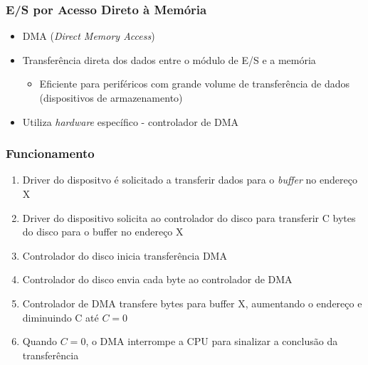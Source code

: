 \documentclass[aspectratio=169,
				xcolor=table]{beamer}
\begin{document}
	\begin{frame}
		\frametitle{E/S por Acesso Direto à Memória}
		\begin{itemize}
			\item DMA (\textit{Direct Memory Access})
			\vspace{1em}
			\item Transferência direta dos dados entre o módulo de E/S e a memória
			\begin{itemize}
				\item Eficiente para periféricos com grande volume de transferência de dados (dispositivos de armazenamento)				
			\end{itemize}
			\vspace{1em}
			\item Utiliza \textit{hardware} específico - controlador de DMA
		\end{itemize}
	\end{frame}
	
	\begin{frame}[allowframebreaks]
		\frametitle{Funcionamento}
		\begin{enumerate}
			\item Driver do dispositvo é solicitado a transferir dados para o \textit{buffer} no endereço X 
			\vspace{1em}
			\item Driver do dispositivo solicita ao controlador do disco para transferir C bytes do disco para o buffer no endereço X
			\vspace{1em}
			\item Controlador do disco inicia transferência DMA
			\framebreak
			\item Controlador do disco envia cada byte ao controlador de DMA
			\vspace{1em}
			\item Controlador de DMA transfere bytes para  buffer X, aumentando o endereço e diminuindo C até $C=0$
			\vspace{1em}
			\item Quando $C=0$, o DMA interrompe a CPU para sinalizar a conclusão da transferência
		\end{enumerate}
	\end{frame}
	
\end{document}
